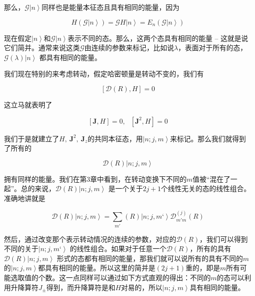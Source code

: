 \documentclass[UTF8,twoside]{ctexart}
\begin{document}
\noindent 那么，$\mathscr{G}\left|n\right\rangle$同样也是能量本征态且具有相同的能量，因为

\begin{equation}  \label{4.1.14}
H\left(\mathscr{G}\left|n\right\rangle\right) = \mathscr{G}H\left|n\right\rangle = E_n \left(\mathscr{G}\left|n\right\rangle\right)
\end{equation}

\noindent 现在假定$\left|n\right\rangle$和$\mathscr{G}\left|n\right\rangle$表示不同的态。那么，这两个态具有相同的能量 -- 这就是说它们简并。通常来说这类$\mathscr{G}$由连续的参数来标记，比如说$\lambda$，表面对于所有的态，$\mathscr{G}\left(\lambda\right)\left|n\right\rangle$ 都具有相同的能量。

我们现在特别的来考虑转动，假定哈密顿量是转动不变的，我们有

\begin{equation}
\left[\mathcal{D}\left(R\right), H\right] = 0
\end{equation}

\noindent 这立马就表明了

\begin{equation}
\left[{\textbf{J}}, H\right] = 0,\ \ \ \left[{\textbf{J}}^2, H\right] = 0
\end{equation}

\noindent 我们于是就建立了$H,\  \textbf{J}^2,\  \textbf{J}_{z}$的共同本征态，用$\left|n; j, m\right\rangle$来标记。那么我们就得到了所有的

\begin{equation}
\mathcal{D}\left(R\right)\left|n; j, m\right\rangle
\end{equation}

\noindent 拥有同样的能量。我们在第3章中看到，在转动变换下不同的$m$值被“混在了一起”。总的来说，$\mathcal{D}\left(R\right)\left|n; j, m\right\rangle$ 是一个关于$2j + 1$个线性无关的态的线性组合。准确地讲就是

\begin{equation}
\mathcal{D}\left(R\right)\left|n; j, m\right\rangle = \sum_{m'} \left(R\right)\left|n; j, m‘\right\rangle \mathcal{D}^{\left(j\right)}_{m'm}\left(R\right)
\end{equation}

\noindent 然后，通过改变那个表示转动情况的连续的参数，对应的$\mathcal{D}\left(R\right)$，我们可以得到不同的关于$\left|n; j, m‘\right\rangle$ 的线性组合。如果对于任意一个$\mathcal{D}\left(R\right)$，所有的具有$\mathcal{D}\left(R\right)\left|n; j, m\right\rangle$ 形式的态都有相同的能量，那我们就可以说所有的具有不同的$m$的$\left|n; j, m\right\rangle$都具有相同的能量。所以这里的简并是$(2j+1)$重的，即是$m$所有可能选取值的个数。这一点同样可以通过如下方式直观的得出：不同的$m$的态可以利用升降算符$J_{\pm}$得到，而升降算符是和$H$对易的，所以$\left|n; j, m\right\rangle$具有相同的能量。
\end{document}
